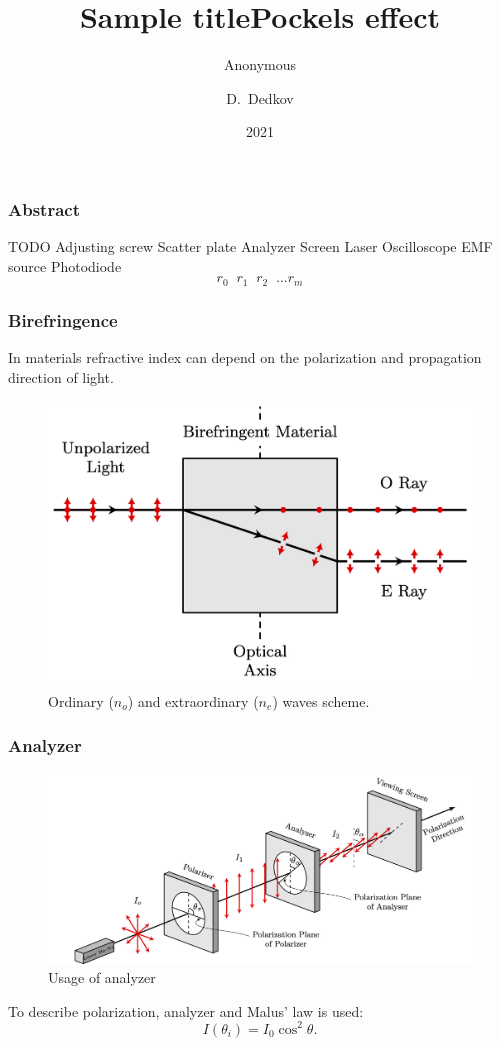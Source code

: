 \documentclass{beamer}
\title{Sample title}
\author{Anonymous}
\institute{Overleaf}
\date{2021}
\title[About Beamer] %
{Pockels effect}
\author[Arthur, Doe] %
{D.~Dedkov }
\institute[VFU] %
{
	Moscow Institute of Physics and Technology
}
\date[VLC 2023] %
\begin{document}
	
\frame{\titlepage}

\begin{frame}
	\frametitle{Abstract}
	TODO
Adjusting screw Scatter plate Analyzer Screen Laser
Oscilloscope EMF source Photodiode
$$r_0 \;\; r_1\;\; r_2\;\; ...r_m$$
\end{frame}

\begin{frame}
	\frametitle{Birefringence}
	\footnotesize
	In materials refractive index can depend on the polarization and propagation direction of light.
	\begin{figure}
		\footnotesize
		\centering
		\includegraphics[width=0.8\linewidth]{res/birefringence}
		\vspace{-5pt}
		\footnotesize
		\caption{\footnotesize Ordinary ($n_o$) and extraordinary ($n_e$) waves scheme.}
	\end{figure}		
\end{frame}

\begin{frame}
	\frametitle{Analyzer}

	\begin{figure}
		\centering
		\includegraphics[width=1\linewidth]{res/polarizer_analyzer}
		\caption{Usage of analyzer}
	\end{figure}

	To describe polarization, analyzer and Malus' law is used:
	$$
	I(\theta_i) = I_0 \cos^2{\theta}.
	\label{eq:malus}
	$$
\end{frame}
\end{document}
